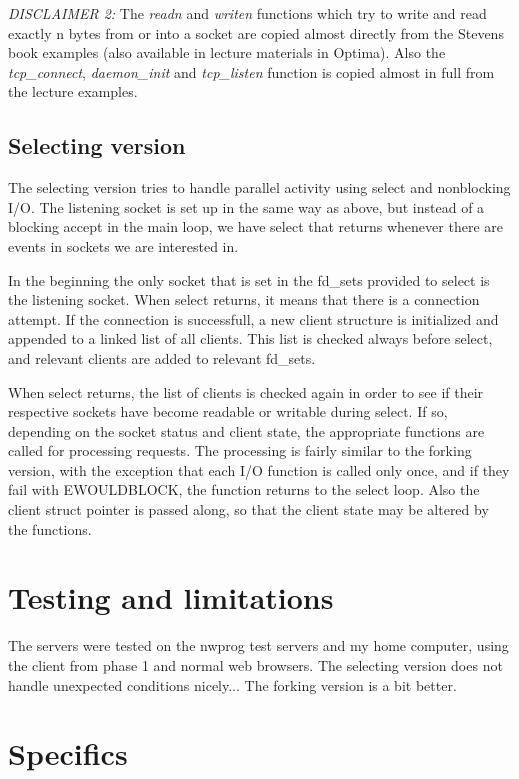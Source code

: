 \documentclass[a4paper,12pt]{article}
\begin{document}
\fussy


\emph{DISCLAIMER 2:} The \emph{readn} and \emph{writen} functions which try to write and read exactly n bytes from or into a socket are copied almost directly from the Stevens book examples (also available in lecture materials in Optima). Also the \emph{tcp\_connect}, \emph{daemon\_init} and \emph{tcp\_listen} function is copied almost in full from the lecture examples.

\subsection{Selecting version}

The selecting version tries to handle parallel activity using select and nonblocking I/O. The listening socket is set up in the same way as above, but instead of a blocking accept in the main loop, we have select that returns whenever there are events in sockets we are interested in.

In the beginning the only socket that is set in the fd\_sets provided to select is the listening socket. When select returns, it means that there is a connection attempt. If the connection is successfull, a new client structure is initialized and appended to a linked list of all clients. This list is checked always before select, and relevant clients are added to relevant fd\_sets.

When select returns, the list of clients is checked again in order to see if their respective sockets have become readable or writable during select. If so, depending on the socket status and client state, the appropriate functions are called for processing requests. The processing is fairly similar to the forking version, with the exception that each I/O function is called only once, and if they fail with EWOULDBLOCK, the function returns to the select loop. Also the client struct pointer is passed along, so that the client state may be altered by the functions.

\section{Testing and limitations}

The servers were tested on the nwprog test servers and my home computer, using the client from phase 1 and normal web browsers. The selecting version does not handle unexpected conditions nicely... The forking version is a bit better.

\section{Specifics}
\end{document}
